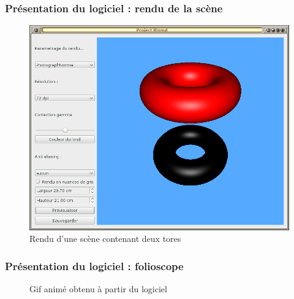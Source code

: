 \documentclass{beamer}
\begin{document}
%
\begin{frame}
\frametitle{Présentation du logiciel : rendu de la scène}
\begin{figure}
\centering
\includegraphics[scale=0.3]{rendu.png}
\caption{Rendu d'une scène contenant deux tores}
\end{figure}

\end{frame}

%
\begin{frame}
\frametitle{Présentation du logiciel : folioscope}
\begin{figure}
\centering
{}
\caption{Gif animé obtenu à partir du logiciel}
\end{figure}
\end{frame}
\end{document}

